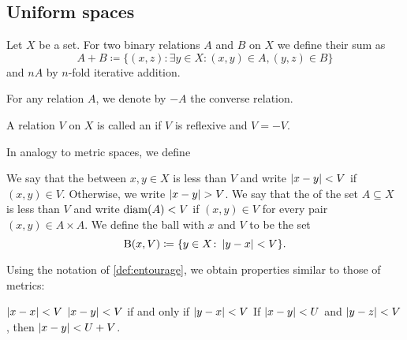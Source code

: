 \subsection{Uniform spaces}\label{subsec:uniform_spaces}

\begin{definition}\label{def:entourage}\cite[section 8.1]{Engelking1989}
  Let \( X \) be a set. For two binary relations \( A \) and \( B \) on \( X \) we define their sum as
  \begin{equation*}
    A + B \coloneqq \{ (x, z) \colon \exists y \in X: (x, y) \in A, (y, z) \in B \}
  \end{equation*}
  and \( nA \) by \( n \)-fold iterative addition.

  For any relation \( A \), we denote by \( -A \) the converse relation.

  A relation \( V \) on \( X \) is called an  if \( V \) is reflexive and \( V = -V \).

  In analogy to metric spaces, we define
  \begin{defenum}
     We say that the  between \( x, y \in X \) is less than \( V \) and write \( \left\vert x - y \right\vert < V \) if \( (x, y) \in V \). Otherwise, we write \( \left\vert x - y \right\vert > V \).
     We say that the  of the set \( A \subseteq X \) is less than \( V \) and write \( \operatorname{diam}(A) < V \) if \( (x, y) \in V \) for every pair \( (x, y) \in A \times A \).
     We define the ball with  \( x \) and  \( V \) to be the set
    \begin{equation*}
      \operatorname{B}(x, V) \coloneqq \{ y \in X \colon \left\vert y - x \right\vert < V \}.
    \end{equation*}
  \end{defenum}
\end{definition}

\begin{proposition}\label{thm:entourage_simulates_metric}\cite[section 8.1]{Engelking1989}
  Using the notation of \cref{def:entourage}, we obtain properties similar to those of metrics:
  \begin{description}
     \( \left\vert x - x \right\vert < V \)
     \( \left\vert x - y \right\vert < V \) if and only if \( \left\vert y - x \right\vert < V \)
     If \( \left\vert x - y \right\vert < U \) and \( \left\vert y - z \right\vert < V \), then \( \left\vert x - y \right\vert < U + V \).
  \end{description}
\end{proposition}

